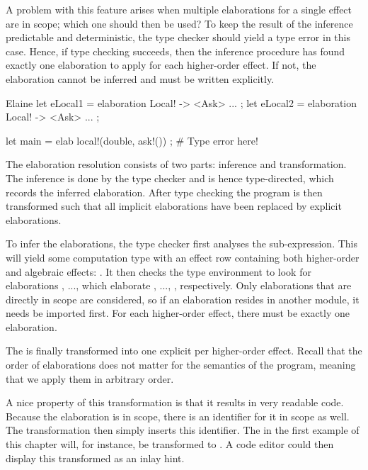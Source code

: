 A problem with this feature arises when multiple elaborations for a single effect are in scope; which one should then be used? To keep the result of the inference predictable and deterministic, the type checker should yield a type error in this case. Hence, if type checking succeeds, then the inference procedure has found exactly one elaboration to apply for each higher-order effect. If not, the elaboration cannot be inferred and must be written explicitly.

\begin{lst}{Elaine}
let eLocal1 = elaboration Local! -> <Ask> { ... };
let eLocal2 = elaboration Local! -> <Ask> { ... };

let main = elab { local!(double, ask!()) }; # Type error here!
\end{lst}

The elaboration resolution consists of two parts: inference and transformation. The inference is done by the type checker and is hence type-directed, which records the inferred elaboration. After type checking the program is then transformed such that all implicit elaborations have been replaced by explicit elaborations.

To infer the elaborations, the type checker first analyses the sub-expression. This will yield some computation type with an effect row containing both higher-order and algebraic effects: . It then checks the type environment to look for elaborations , ...,  which elaborate , ..., , respectively. Only elaborations that are directly in scope are considered, so if an elaboration resides in another module, it needs be imported first. For each higher-order effect, there must be exactly one elaboration.

The  is finally transformed into one explicit  per higher-order effect. Recall that the order of elaborations does not matter for the semantics of the program, meaning that we apply them in arbitrary order.

A nice property of this transformation is that it results in very readable code. Because the elaboration is in scope, there is an identifier for it in scope as well. The transformation then simply inserts this identifier. The \elab in the first example of this chapter will, for instance, be transformed to . A code editor could then display this transformed  as an inlay hint.

